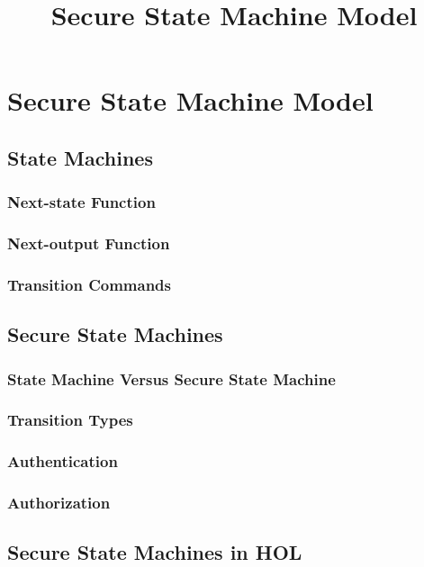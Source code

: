 \documentclass[../../main/main.tex]{subfiles}
\begin{document}
\title{Secure State Machine Model}

\chapter{Secure State Machine Model}\label{chp:ssmmodel}

\section{State Machines}\label{sec:sm}

\subsection{Next-state Function}
\subsection{Next-output Function}
\subsection{Transition Commands}

\section{Secure State Machines}\label{sec:ssm}

\subsection{State Machine Versus Secure State Machine}
\subsection{Transition Types}
\subsection{Authentication}
\subsection{Authorization}


\section{Secure State Machines in HOL}\label{sec:sminHOL}
\end{document}
